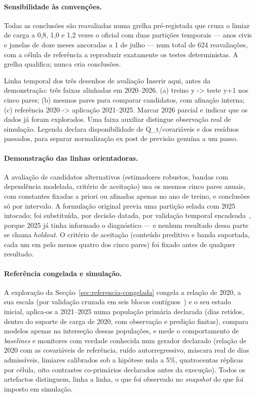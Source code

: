 \paragraph{Sensibilidade às convenções.} Todas as conclusões são
reavaliadas numa grelha pré-registada que cruza o limiar de carga a 0,8,
1,0 e 1,2 vezes o oficial com duas partições temporais --- anos civis e
janelas de doze meses ancoradas a 1 de julho --- num total de 624
reavaliações, com a célula de referência a reproduzir exatamente os testes
deterministas. A grelha qualifica; nunca cria conclusões.

{Linha temporal dos três desenhos de avaliação}
{Inserir aqui, antes da demonstração: três faixas alinhadas em 2020--2026.
(a) treino y -\textgreater{} teste y+1 nos cinco pares; (b) mesmos pares para comparar
candidatos, com afinação interna; (c) referência 2020 -\textgreater{} aplicação
2021--2025. Marcar 2026 parcial e indicar que os dados já foram explorados.
Uma faixa auxiliar distingue observação real de simulação. Legenda
declara disponibilidade de Q\_t/covariáveis e dos resíduos passados,
para separar normalização ex post de previsão genuína a um passo.}%
\paragraph{Demonstração das linhas orientadoras.} A avaliação de
candidatos alternativos (estimadores robustos, bandas com dependência
modelada, critério de aceitação) usa os mesmos cinco pares anuais, com
constantes fixadas a priori ou afinadas apenas no ano de treino, e
conclusões só por intervalo. A formulação original previa uma partição
selada com 2025 intocado; foi substituída, por decisão datada, por
validação temporal encadeada~\cite{Tashman2000,BergmeirHyndmanKoo2018},
porque 2025 já tinha informado o diagnóstico --- e nenhum resultado dessa parte se chama \emph{holdout}. O
critério de aceitação (conteúdo preditivo e banda suportada, cada um em
pelo menos quatro dos cinco pares) foi fixado antes de qualquer resultado.

\paragraph{Referência congelada e simulação.} A exploração da
Secção~\ref{sec:referencia-congelada} congela a relação de 2020, a sua
escala (por validação cruzada em seis blocos contíguos~\cite{BergmeirHyndmanKoo2018})
e o seu estado
inicial, aplica-os a 2021--2025 numa população primária declarada (dias
retidos, dentro do suporte de carga de 2020, com observação e predição
finitas), compara modelos apenas na interseção dessas populações, e mede o
comportamento de \emph{baselines} e monitores com verdade conhecida num
gerador declarado (relação de 2020 com as covariáveis de referência, ruído
autorregressivo, máscara real de dias admissíveis, limiares calibrados sob
a hipótese nula a 5\%, quatrocentas réplicas por célula, oito contrastes
co-primários declarados antes da execução). Todos os artefactos
distinguem, linha a linha, o que foi observado no \emph{snapshot} do que
foi imposto em simulação.

